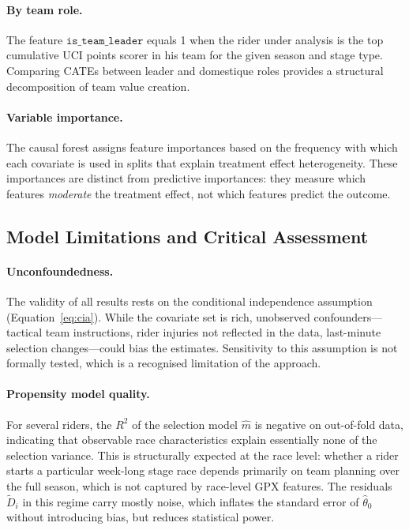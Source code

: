 \paragraph{By team role.} The feature $\texttt{is\_team\_leader}$ equals 1 when the rider under analysis is the top cumulative UCI points scorer in his team for the given season and stage type. Comparing CATEs between leader and domestique roles provides a structural decomposition of team value creation.

\paragraph{Variable importance.} The causal forest assigns feature importances based on the frequency with which each covariate is used in splits that explain treatment effect heterogeneity. These importances are distinct from predictive importances: they measure which features \emph{moderate} the treatment effect, not which features predict the outcome.

\subsection{Model Limitations and Critical Assessment}

\paragraph{Unconfoundedness.} The validity of all results rests on the conditional independence assumption (Equation~\eqref{eq:cia}). While the covariate set is rich, unobserved confounders---tactical team instructions, rider injuries not reflected in the data, last-minute selection changes---could bias the estimates. Sensitivity to this assumption is not formally tested, which is a recognised limitation of the approach.

\paragraph{Propensity model quality.} For several riders, the $R^2$ of the selection model $\hat{m}$ is negative on out-of-fold data, indicating that observable race characteristics explain essentially none of the selection variance. This is structurally expected at the race level: whether a rider starts a particular week-long stage race depends primarily on team planning over the full season, which is not captured by race-level GPX features. The residuals $\tilde{D}_i$ in this regime carry mostly noise, which inflates the standard error of $\hat{\theta}_0$ without introducing bias, but reduces statistical power.


